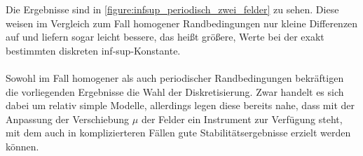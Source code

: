 \documentclass[../main.tex]{subfiles}
\begin{document}
Die Ergebnisse sind in \cref{figure:infsup_periodisch_zwei_felder} zu sehen.
Diese weisen im Vergleich zum Fall homogener Randbedingungen nur kleine Differenzen auf und liefern sogar leicht bessere, das heißt größere, Werte bei der exakt bestimmten diskreten inf-sup-Konstante.

\paragraph{}
Sowohl im Fall homogener als auch periodischer Randbedingungen bekräftigen die vorliegenden Ergebnisse die Wahl der Diskretisierung.
Zwar handelt es sich dabei um relativ simple Modelle, allerdings legen diese bereits nahe, dass mit der Anpassung der Verschiebung $\mu$ der Felder ein Instrument zur Verfügung steht, mit dem auch in komplizierteren Fällen gute Stabilitätsergebnisse erzielt werden können.
\end{document}
